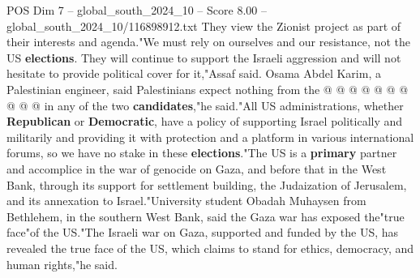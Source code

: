 \begin{textsample}{POS Dim 7 – global\_south\_2024\_10 – Score 8.00 – global\_south\_2024\_10/116898912.txt}
They view the Zionist project as part of their interests and agenda."We must rely on ourselves and our resistance, not the US \textbf{elections}.
They will continue to support the Israeli aggression and will not hesitate to provide political cover for it,"Assaf said.
Osama Abdel Karim, a Palestinian engineer, said Palestinians expect nothing from the @ @ @ @ @ @ @ @ @ @ in any of the two \textbf{candidates},"he said."All US administrations, whether \textbf{Republican} or \textbf{Democratic}, have a policy of supporting Israel politically and militarily and providing it with protection and a platform in various international forums, so we have no stake in these \textbf{elections}."The US is a \textbf{primary} partner and accomplice in the war of genocide on Gaza, and before that in the West Bank, through its support for settlement building, the Judaization of Jerusalem, and its annexation to Israel."University student Obadah Muhaysen from Bethlehem, in the southern West Bank, said the Gaza war has exposed the"true face"of the US."The Israeli war on Gaza, supported and funded by the US, has revealed the true face of the US, which claims to stand for ethics, democracy, and human rights,"he said.

\end{textsample}
